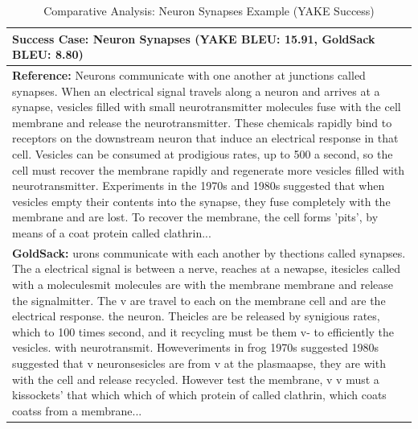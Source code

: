 \begin{table}[htbp]
\centering
\small
\caption{Comparative Analysis: Neuron Synapses Example (YAKE Success)}
\label{tab:yake-success}
\begin{tabular}{|p{12cm}|}
\hline
\textbf{Success Case: Neuron Synapses (YAKE BLEU: 15.91, GoldSack BLEU: 8.80)} \\
\hline
\textbf{Reference:} Neurons communicate with one another at junctions called synapses. When an electrical signal travels along a neuron and arrives at a synapse, vesicles filled with small neurotransmitter molecules fuse with the cell membrane and release the neurotransmitter. These chemicals rapidly bind to receptors on the downstream neuron that induce an electrical response in that cell. Vesicles can be consumed at prodigious rates, up to 500 a second, so the cell must recover the membrane rapidly and regenerate more vesicles filled with neurotransmitter. Experiments in the 1970s and 1980s suggested that when vesicles empty their contents into the synapse, they fuse completely with the membrane and are lost. To recover the membrane, the cell forms 'pits', by means of a coat protein called clathrin... \\
\hline
\textbf{GoldSack:} \colorbox{red!20}{urons communicate with} \colorbox{red!20}{each another by} thections called synapses. \colorbox{red!20}{The a electrical signal is} \colorbox{red!20}{between a nerve, reaches} \colorbox{red!20}{at a newapse, itesicles} \colorbox{red!20}{called with a moleculesmit} \colorbox{red!20}{molecules} are with the membrane membrane and release \colorbox{red!20}{the signalmitter}. \colorbox{red!20}{The v are travel to each on} \colorbox{red!20}{the membrane cell} and \colorbox{red!20}{are the electrical response.} \colorbox{red!20}{the neuron}. \colorbox{red!20}{Theicles are be released by} \colorbox{red!20}{synigious rates}, which to 100 times second, and it recycling must be them v- to efficiently the vesicles. with neurotransmit. Howeveriments in frog 1970s suggested 1980s suggested that v neuronsesicles are from v at the plasmaapse, they are with with the cell and release recycled. However test the membrane, v v must a kissockets' that which which of which protein of called clathrin, which coats coatss from a membrane... \\
\hline

\end{tabular}
\end{table}
